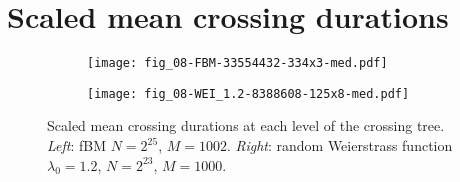 \documentclass[a4paper]{extarticle}
\begin{document}
\clearpage


\section{Scaled mean crossing durations} %
\label{sec:scaled_mean_crossing_durations}

\begin{figure}[ht]
  \centering
  \begin{subfigure}[b]{0.45\textwidth}
    \texttt{[image: fig\_08-FBM-33554432-334x3-med.pdf]}
  \end{subfigure}\hspace{-2.em}
  \begin{subfigure}[b]{0.45\textwidth}
    \texttt{[image: fig\_08-WEI\_1.2-8388608-125x8-med.pdf]}
  \end{subfigure}\vspace{-.5em}

  \caption{Scaled mean crossing durations at each level of the crossing tree.
  \emph{Left}: fBM $N = 2^{25}$, $M=1002$.
  \emph{Right}: random Weierstrass function $\lambda_0=1.2$, $N = 2^{23}$, $M=1000$.}
  \label{fig:fbm_wei1_2_durations}
\end{figure}
\end{document}
